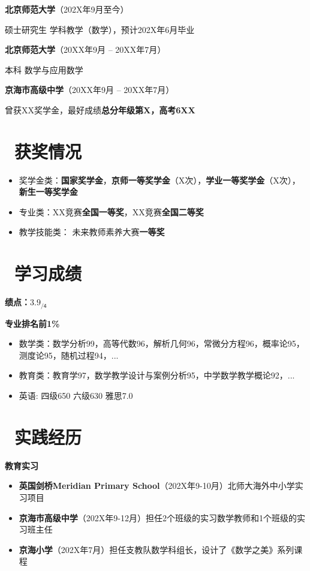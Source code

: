 \documentclass[11pt]{article}
\begin{document}
\textbf{北京师范大学}（202X年9月至今）

\qquad 硕士研究生 \quad 学科教学（数学），预计202X年6月毕业

\textbf{北京师范大学}（20XX年9月 -- 20XX年7月）

\qquad 本科 \quad 数学与应用数学

\textbf{京海市高级中学}（20XX年9月 -- 20XX年7月） %

\qquad 曾获XX奖学金，最好成绩\textbf{总分年级第X，高考6XX}

\section{\makebox[\widthof{\faGraduationCap}][c]{\color{CVBlue}\faTrophy}\ 获奖情况}
\begin{itemize}
	\item 奖学金类：\textbf{国家奖学金}，\textbf{京师一等奖学金}（X次），\textbf{学业一等奖学金}（X次），\textbf{新生一等奖学金}
	\item 专业类：XX竞赛\textbf{全国一等奖}，XX竞赛\textbf{全国二等奖}
	\item 教学技能类： 未来教师素养大赛\textbf{一等奖}
\end{itemize}


\section{\makebox[\widthof{\faGraduationCap}][c]{\color{CVBlue}\faFileText}\ 学习成绩}
\textbf{绩点：$\mathsf{3.9_{/4}}$} \

\textbf{专业排名前1\%}
\begin{itemize}[parsep=0.5ex]
	\item 数学类：数学分析99，高等代数96，解析几何96，常微分方程96，概率论95，测度论95，随机过程94，...
	\item 教育类：教育学97，数学教学设计与案例分析95，中学数学教学概论92，...
	\item 英语: 四级650 六级630 雅思7.0
\end{itemize}


\section{\makebox[\widthof{\faGraduationCap}][c]{\color{CVBlue}\faUniversity}\ 实践经历}
\textbf{教育实习}
\begin{itemize}
	\item \textbf{英国剑桥Meridian Primary School}（202X年9-10月）北师大海外中小学实习项目
	\item \textbf{京海市高级中学}（202X年9-12月）担任2个班级的实习数学教师和1个班级的实习班主任
	\item \textbf{京海小学}（202X年7月）担任支教队数学科组长，设计了《数学之美》系列课程
\end{itemize}
\end{document}
